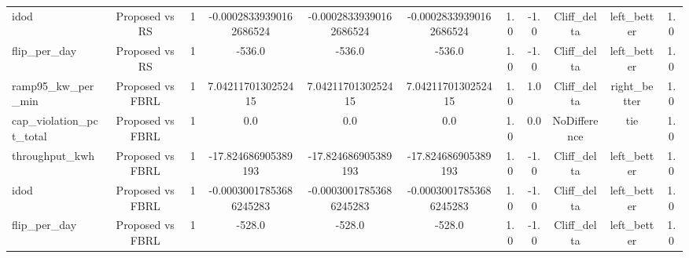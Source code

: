 \begin{table}[t]
\begin{tabular}{lcccccccccc}
idod & Proposed vs RS & 1 & -0.00028339390162686524 & -0.00028339390162686524 & -0.00028339390162686524 & 1.0 & -1.0 & Cliff\_delta & left\_better & 1.0 \\
flip\_per\_day & Proposed vs RS & 1 & -536.0 & -536.0 & -536.0 & 1.0 & -1.0 & Cliff\_delta & left\_better & 1.0 \\
ramp95\_kw\_per\_min & Proposed vs FBRL & 1 & 7.0421170130252415 & 7.0421170130252415 & 7.0421170130252415 & 1.0 & 1.0 & Cliff\_delta & right\_better & 1.0 \\
cap\_violation\_pct\_total & Proposed vs FBRL & 1 & 0.0 & 0.0 & 0.0 & 1.0 & 0.0 & NoDifference & tie & 1.0 \\
throughput\_kwh & Proposed vs FBRL & 1 & -17.824686905389193 & -17.824686905389193 & -17.824686905389193 & 1.0 & -1.0 & Cliff\_delta & left\_better & 1.0 \\
idod & Proposed vs FBRL & 1 & -0.00030017853686245283 & -0.00030017853686245283 & -0.00030017853686245283 & 1.0 & -1.0 & Cliff\_delta & left\_better & 1.0 \\
flip\_per\_day & Proposed vs FBRL & 1 & -528.0 & -528.0 & -528.0 & 1.0 & -1.0 & Cliff\_delta & left\_better & 1.0 \\
\bottomrule
\end{tabular}
\end{table}